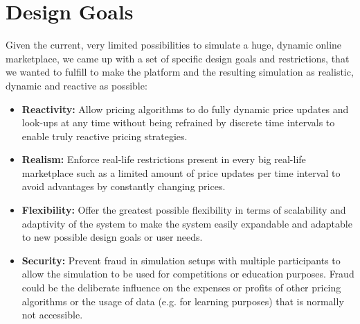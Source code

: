 \fi

\section{Design Goals}
\label{sec:Design_Goals}
%
Given the current, very limited possibilities to simulate a huge, dynamic online marketplace, we came up with a set of specific design goals and restrictions, that we wanted to fulfill to make the platform and the resulting simulation as realistic, dynamic and reactive as possible: 
\begin{itemize}
    \item \textbf{Reactivity:} Allow pricing algorithms to do fully dynamic price updates and look-ups at any time without being refrained by discrete time intervals to enable truly reactive pricing strategies.
    \item \textbf{Realism:} Enforce real-life restrictions present in every big real-life marketplace such as a limited amount of price updates per time interval to avoid advantages by constantly changing prices.
    \item \textbf{Flexibility:} Offer the greatest possible flexibility in terms of scalability and adaptivity of the system to make the system easily expandable and adaptable to new possible design goals or user needs.
    \item \textbf{Security:} Prevent fraud in simulation setups with multiple participants to allow the simulation to be used for competitions or education purposes. Fraud could be the deliberate influence on the expenses or profits of other pricing algorithms or the usage of data (e.g. for learning purposes) that is normally not accessible.
\end{itemize}
